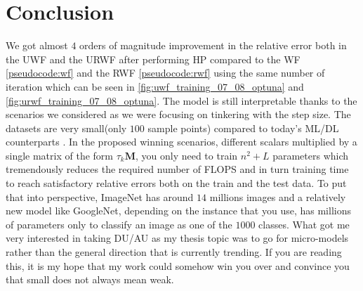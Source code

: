 \chapter{Conclusion}

We got almost $4$ orders of magnitude improvement in the relative error both in the \ac{UWF} and the 
\ac{URWF} after performing \ac{HP}\cite{Hutter2019}\cite{Akiba2019} compared to 
the \ac{WF}\cite{Candes2014} \cref{pseudocode:wf} and the 
\ac{RWF}\cite{Zhang2016} \cref{pseudocode:rwf} using the same number of iteration which can be seen 
in \cref{fig:uwf_training_07_08_optuna} and \ref{fig:urwf_training_07_08_optuna}. The model is still interpretable thanks 
to the scenarios we considered as we were focusing on tinkering with the step size. The datasets are very small(only $100$ sample points) compared to today's 
\ac{ML}/\ac{DL}\cite{Goodfellow2016}\cite{LeCun2015} counterparts \cite{Krizhevsky2017}\cite{Szegedy2014}. In 
the proposed winning scenarios, different scalars multiplied by a single matrix of the form $\tau_k\boldsymbol{M}$, 
you only need to train $n^2+L$ parameters which tremendously reduces the required number of 
\ac{FLOPS}\cite{Hager2010}\cite{Hennessy2019} and in turn training time to reach satisfactory relative errors both 
on the train and the test data. To put that into perspective, ImageNet\cite{SVLL2021} has around $14$ millions images and a 
relatively new model like GoogleNet\cite{Szegedy2014}, depending on the instance that you use, has millions of 
parameters only to classify an image as one of the $1000$ classes. What got me very interested in taking 
\ac{DU}/\ac{AU}\cite{Monga2019} as my thesis topic was to go for micro-models rather than the general direction 
that is currently trending. If you are reading this, it is my hope that my work could somehow win you over and convince 
you that small does not always mean weak.